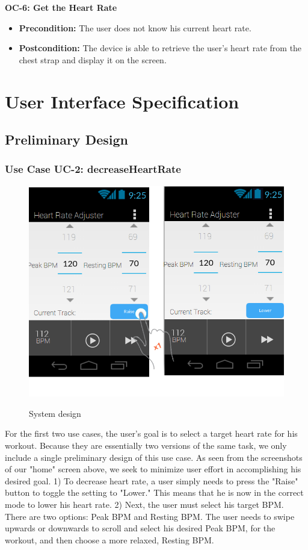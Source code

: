 \documentclass[letterpaper,english, 12pt]{scrreprt}
\begin{document}
{\bf OC-6: Get the Heart Rate}
\begin{itemize}
	\item {\bf Precondition: } The user does not know his current heart rate.
	\item {\bf Postcondition: } The device is able to retrieve the user's heart rate from the chest strap and display it on the screen.
\end{itemize}




\chapter{User Interface Specification}
\section{Preliminary Design}

\subsection{Use Case UC-2: decreaseHeartRate}

\begin{figure}[H]
	\centering
	\includegraphics{img/Prelim_Design/PrelimDesign_1.png}\\
	\caption{System design}
\end{figure}

For the first two use cases, the user's goal is to select a target heart rate for his workout. Because they are essentially two versions of the same task, we only include a single preliminary design of this use case. As seen from the screenshots of our "home" screen above, we seek to minimize user effort in accomplishing his desired goal. 1) To decrease heart rate, a user simply needs to press the "Raise" button to toggle the setting to "Lower." This means that he is now in the correct mode to lower his heart rate. 2) Next, the user must select his target BPM. There are two options: Peak BPM and Resting BPM. The user needs to swipe upwards or downwards to scroll and select his desired Peak BPM, for the workout, and then choose a more relaxed, Resting BPM.
\end{document}
